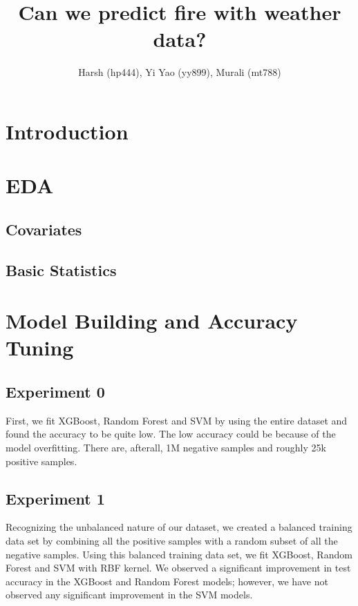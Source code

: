 \documentclass[10pt]{article}
\begin{document}
\title{\bf Can we predict fire with weather data?}
\author{Harsh (hp444), Yi Yao (yy899), Murali (mt788)}
\maketitle

\begin{abstract}
\end{abstract}

\section{Introduction}

\section{EDA}
\subsection{Covariates}
\subsection{Basic Statistics}

\section{Model Building and Accuracy Tuning}
\begin{figure}[H]
    \centering
    
\end{figure}
\subsection{Experiment 0}
First, we fit XGBoost, Random Forest and SVM by using the entire dataset
and found the accuracy to be quite low. The low accuracy could be because
of the model overfitting. There are, afterall, 1M negative samples and
roughly 25k positive samples.
\subsection{Experiment 1}
Recognizing the unbalanced nature of our dataset, we created a balanced
training data set by combining all the positive samples with a random
subset of all the negative samples. Using this balanced training data set,
we fit XGBoost, Random Forest and SVM with RBF kernel. We observed a
significant improvement in test accuracy in the XGBoost and Random Forest
models; however, we have not observed any significant improvement in the
SVM models.
\end{document}
